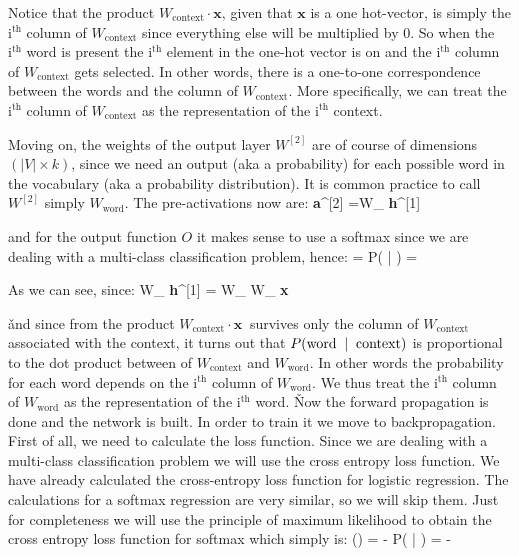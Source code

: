 Notice that the product $W_{\text{context}} \cdot \textbf{x}$, given that $\textbf{x}$ is a one hot-vector, is
simply the $\text{i}^{\text{th}}$ column of $W_{\text{context}}$ since everything else will be multiplied by 0.
So when the $\text{i}^{\text{th}}$ word is present the $\text{i}^{\text{th}}$ element in the one-hot vector
is on and the $\text{i}^{\text{th}}$ column of $W_{\text{context}}$ gets selected. In other words, there is a
one-to-one correspondence between the words and the column of $W_{\text{context}}$. More specifically, we can treat
the $\text{i}^{\text{th}}$ column of $W_{\text{context}}$ as the representation of the
$\text{i}^{\text{th}}$ context.

\be
\vspace{-15pt}
\ee

Moving on, the weights of the output layer $W^{[2]}$ are of course of dimensions $(|V| \times k)$, since we need an
output (aka a probability) for each possible word in the vocabulary (aka a probability distribution). It is common
practice to call $W^{[2]}$ simply $W_{\text{word}}$. The pre-activations now are:
\bse
\textbf{a}^{[2]} =W_{} \cdot \textbf{h}^{[1]}
\ese

and for the output function $O$ it makes sense to use a softmax since we are dealing with a multi-class
classification problem, hence:
\bse
{} = P( | ) = 
\ese

As we can see, since:
\bse
W_{} \cdot \textbf{h}^{[1]} = W_{} \cdot W_{} \cdot \textbf{x}
\ese

\v

and since from the product $W_{\text{context}} \cdot \textbf{x} \:$ survives only the column of
$W_{\text{context}}$ associated with the context, it turns out that $P (\text{word \:} | \text{\: context})$ is
proportional to the dot product between of $W_{\text{context}}$ and $W_{\text{word}}$. In other words the
probability for each word depends on the $\text{i}^{\text{th}}$ column of $W_{\text{word}}$. We thus treat the
$\text{i}^{\text{th}}$ column of $W_{\text{word}}$ as the representation of the $\text{i}^{\text{th}}$ word.
\v

Now the forward propagation is done and the network is built. In order to train it we move to backpropagation. First
of all, we need to calculate the loss function. Since we are dealing with a multi-class classification problem we
will use the cross entropy loss function. We have already calculated the cross-entropy loss function for logistic
regression. The calculations for a softmax regression are very similar, so we will skip them. Just for completeness
we will use the principle of maximum likelihood to obtain the cross entropy loss function for softmax which simply
is:
\bse
{}(\theta) = - \ln P( | ) = - \ln {}
\ese

